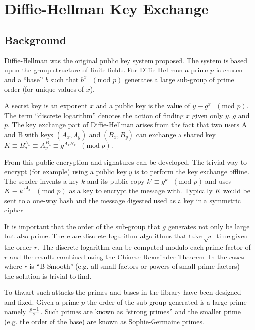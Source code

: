 \documentclass[a4paper]{book}
\begin{document}
\chapter{Diffie-Hellman Key Exchange}

\section{Background}

Diffie-Hellman was the original public key system proposed.  The system is based upon the group structure
of finite fields.  For Diffie-Hellman a prime $p$ is chosen and a ``base'' $b$ such that $b^x\mbox{ }(\mbox{mod }p)$ 
generates a large sub-group of prime order (for unique values of $x$).

A secret key is an exponent $x$ and a public key is the value of $y \equiv g^x\mbox{ }(\mbox{mod }p)$.  The term
``discrete logarithm'' denotes the action of finding $x$ given only $y$, $g$ and $p$.  The key exchange part of
Diffie-Hellman arises from the fact that two users A and B with keys $(A_x, A_y)$ and $(B_x, B_y)$ can exchange 
a shared key $K \equiv B_y^{A_x} \equiv A_y^{B_x} \equiv g^{A_xB_x}\mbox{ }(\mbox{mod }p)$.

From this public encryption and signatures can be developed.  The trivial way to encrypt (for example) using a public key 
$y$ is to perform the key exchange offline.  The sender invents a key $k$ and its public copy 
$k' \equiv g^k\mbox{ }(\mbox{mod }p)$ and uses $K \equiv k'^{A_x}\mbox{ }(\mbox{mod }p)$ as a key to encrypt
the message with.  Typically $K$ would be sent to a one-way hash and the message digested used as a key in a 
symmetric cipher.

It is important that the order of the sub-group that $g$ generates not only be large but also prime.  There are
discrete logarithm algorithms that take $\sqrt r$ time given the order $r$.  The discrete logarithm can be computed
modulo each prime factor of $r$ and the results combined using the Chinese Remainder Theorem.  In the cases where 
$r$ is ``B-Smooth'' (e.g. all small factors or powers of small prime factors) the solution is trivial to find.

To thwart such attacks the primes and bases in the library have been designed and fixed.  Given a prime $p$ the order of
 the sub-group generated is a large prime namely ${p - 1} \over 2$.  Such primes are known as ``strong primes'' and the 
smaller prime (e.g. the order of the base) are known as Sophie-Germaine primes.
\end{document}
